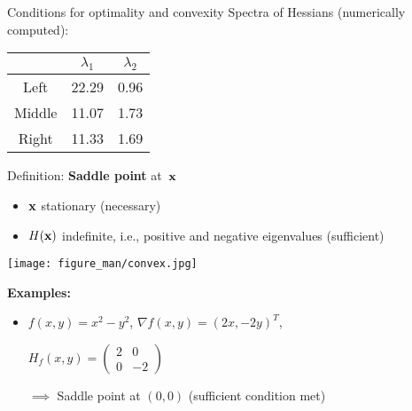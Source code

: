 \documentclass[11pt,compress,t,notes=noshow, xcolor=table]{beamer}
\begin{document}
\begin{vbframe}{Conditions for optimality and convexity}
Spectra of Hessians (numerically computed):
    
\begin{table}
    \centering
    \begin{tabular}{c|c|c}
               & $\lambda_1$ & $\lambda_2$ \\ \hline\hline
        Left   & 22.29       & 0.96        \\ \hline
        Middle & 11.07       & 1.73        \\ \hline
        Right  & 11.33       & 1.69
    \end{tabular}
\end{table}

    
\framebreak 

Definition: \textbf{Saddle point} at~$\mathbf{x}$
\begin{itemize}
    \item $\mathbf{x}$ stationary (necessary)
    \item $H(\mathbf{x})$ indefinite, i.e., positive and negative eigenvalues (sufficient)
\end{itemize}

\lz

\begin{center}
    \texttt{[image: figure\_man/convex.jpg]}
\end{center}

\framebreak

\textbf{Examples:}

\lz

\begin{itemize}
    \item $f(x,y) = x^2 - y^2$, $\nabla f(x,y) = (2x,-2y)^T$,
        
        $H_f(x,y) = \begin{pmatrix}2 & 0 \\ 0 & -2\end{pmatrix}$
        
        $\implies$ Saddle point at $(0,0)$ (sufficient condition met)


\end{itemize}
\end{vbframe}
\end{document}
